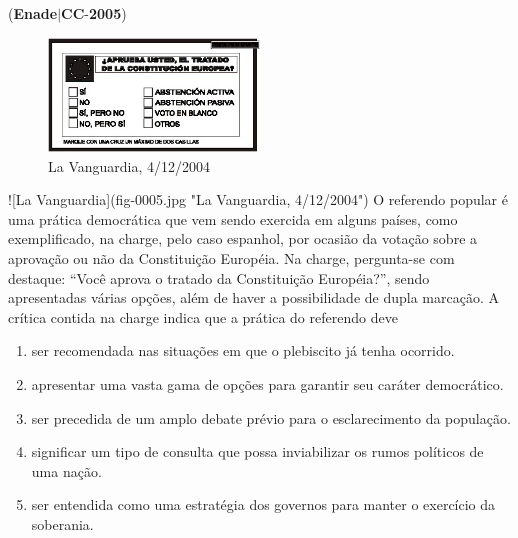 \documentclass{exam}
\begin{document}
\begin{questions}
\question (\textbf{Enade}$|$\textbf{CC}-\textbf{2005}) \begin{figure}[H]
	\begin{center}
		\includegraphics[width=0.5\textwidth]{CIENCIA_DA_COMPUTACAO_Prova2005-utf8_figuras/fig-0005.jpg}
		\caption{La Vanguardia, 4/12/2004}
	\end{center}
\end{figure}
![La Vanguardia](fig-0005.jpg "La Vanguardia, 4/12/2004")
O referendo popular é uma prática democrática que vem sendo
exercida em alguns países, como exemplificado, na charge, pelo
caso espanhol, por ocasião da votação sobre a aprovação ou
não da Constituição Européia. Na charge, pergunta-se com
destaque: “Você aprova o tratado da Constituição Européia?”,
sendo apresentadas várias opções, além de haver a
possibilidade de dupla marcação.
A crítica contida na charge indica que a prática do referendo
deve
	\begin{enumerate}[label=\alph*)]
		\item  ser recomendada nas situações em que o plebiscito já tenha
ocorrido.
		\item  apresentar uma vasta gama de opções para garantir seu
caráter democrático.
		\item  ser precedida de um amplo debate prévio para o
esclarecimento da população.
		\item  significar um tipo de consulta que possa inviabilizar os
rumos políticos de uma nação.
		\item  ser entendida como uma estratégia dos governos para
manter o exercício da soberania.

	\end{enumerate}


\end{questions}
\end{document}
